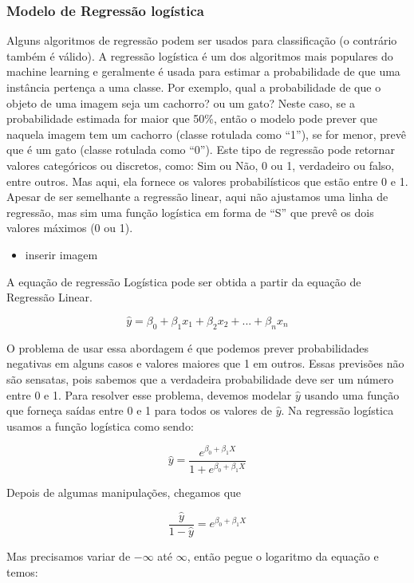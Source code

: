 \documentclass[
  letterpaper,
  DIV=11,
  numbers=noendperiod]{scrreprt}
\providecommand{\tightlist}{%
  \setlength{\itemsep}{0pt}\setlength{\parskip}{0pt}}\usepackage{longtable,booktabs,array}
\begin{document}
\hypertarget{modelo-de-regressuxe3o-loguxedstica}{%
\subsubsection{Modelo de Regressão
logística}\label{modelo-de-regressuxe3o-loguxedstica}}

Alguns algoritmos de regressão podem ser usados para classificação (o
contrário também é válido). A regressão logística é um dos algoritmos
mais populares do machine learning e geralmente é usada para estimar a
probabilidade de que uma instância pertença a uma classe. Por exemplo,
qual a probabilidade de que o objeto de uma imagem seja um cachorro? ou
um gato? Neste caso, se a probabilidade estimada for maior que 50\%,
então o modelo pode prever que naquela imagem tem um cachorro (classe
rotulada como ``1''), se for menor, prevê que é um gato (classe rotulada
como ``0''). Este tipo de regressão pode retornar valores categóricos ou
discretos, como: Sim ou Não, 0 ou 1, verdadeiro ou falso, entre outros.
Mas aqui, ela fornece os valores probabilísticos que estão entre 0 e 1.
Apesar de ser semelhante a regressão linear, aqui não ajustamos uma
linha de regressão, mas sim uma função logística em forma de ``S'' que
prevê os dois valores máximos (0 ou 1).

\begin{itemize}
\tightlist
\item
  inserir imagem
\end{itemize}

A equação de regressão Logística pode ser obtida a partir da equação de
Regressão Linear.

\[
\hat y = \beta_0 + \beta_1x_1 + \beta_2x_2 + ...+ \beta_nx_n
\]

O problema de usar essa abordagem é que podemos prever probabilidades
negativas em alguns casos e valores maiores que 1 em outros. Essas
previsões não são sensatas, pois sabemos que a verdadeira probabilidade
deve ser um número entre 0 e 1. Para resolver esse problema, devemos
modelar \(\hat y\) usando uma função que forneça saídas entre 0 e 1 para
todos os valores de \(\hat y\). Na regressão logística usamos a função
logística como sendo:

\[
\hat y = \frac{e^{\beta_0+\beta_1X}}{1 + e^{\beta_0+\beta_1X}}
\]

Depois de algumas manipulações, chegamos que

\[
\frac{\hat y}{1- \hat y} = e^{\beta_0+\beta_1X}
\]

Mas precisamos variar de \(-\infty\) até \(\infty\), então pegue o
logaritmo da equação e temos:
\end{document}
